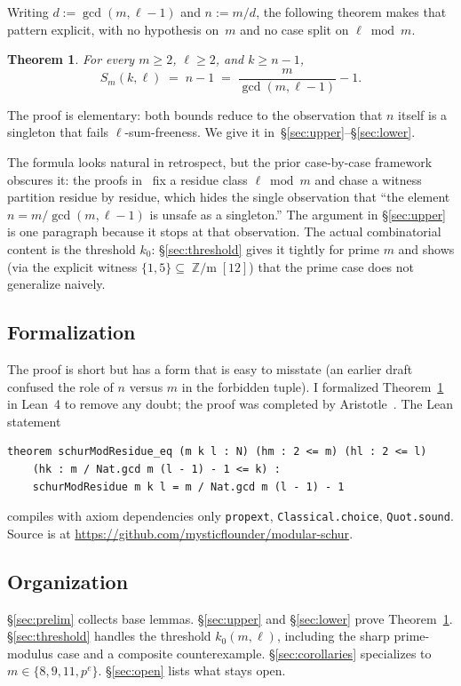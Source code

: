 \documentclass[11pt]{amsart}
\theoremstyle{plain}
\newtheorem{theorem}{Theorem}[section]
\theoremstyle{definition}
\DeclareMathOperator{\Zm}{\mathbb{Z}/m}
\begin{document}
Writing $d:=\gcd(m,\ell-1)$ and $n:=m/d$, the following theorem makes that pattern explicit, with no hypothesis on~$m$ and no case split on $\ell\bmod m$.

\begin{theorem}\label{thm:main}
For every $m\ge 2$, $\ell\ge 2$, and $k\ge n-1$,
\[
S_m(k,\ell) \;=\; n - 1 \;=\; \frac{m}{\gcd(m,\ell-1)} - 1.
\]
\end{theorem}

The proof is elementary: both bounds reduce to the observation that $n$ itself is a singleton that fails $\ell$-sum-freeness. We give it in~\S\ref{sec:upper}--\S\ref{sec:lower}.

The formula looks natural in retrospect, but the prior case-by-case framework obscures it: the proofs in~\cite{CMD2013,DSWH2025} fix a residue class $\ell\bmod m$ and chase a witness partition residue by residue, which hides the single observation that ``the element $n=m/\gcd(m,\ell-1)$ is unsafe as a singleton.'' The argument in \S\ref{sec:upper} is one paragraph because it stops at that observation. The actual combinatorial content is the threshold $k_0$: \S\ref{sec:threshold} gives it tightly for prime $m$ and shows (via the explicit witness $\{1,5\}\subseteq\Zm[12]$) that the prime case does not generalize naively.

\subsection*{Formalization}

The proof is short but has a form that is easy to misstate (an earlier draft confused the role of $n$ versus $m$ in the forbidden tuple). I formalized Theorem~\ref{thm:main} in Lean~4 to remove any doubt; the proof was completed by Aristotle~\cite{aristotle}. The Lean statement
\begin{verbatim}
theorem schurModResidue_eq (m k l : N) (hm : 2 <= m) (hl : 2 <= l)
    (hk : m / Nat.gcd m (l - 1) - 1 <= k) :
    schurModResidue m k l = m / Nat.gcd m (l - 1) - 1
\end{verbatim}
compiles with axiom dependencies only \texttt{propext}, \texttt{Classical.choice}, \texttt{Quot.sound}. Source is at \url{https://github.com/mysticflounder/modular-schur}.

\subsection*{Organization}
\S\ref{sec:prelim} collects base lemmas. \S\ref{sec:upper} and \S\ref{sec:lower} prove Theorem~\ref{thm:main}. \S\ref{sec:threshold} handles the threshold $k_0(m,\ell)$, including the sharp prime-modulus case and a composite counterexample. \S\ref{sec:corollaries} specializes to $m\in\{8,9,11,p^e\}$. \S\ref{sec:open} lists what stays open.
\end{document}
